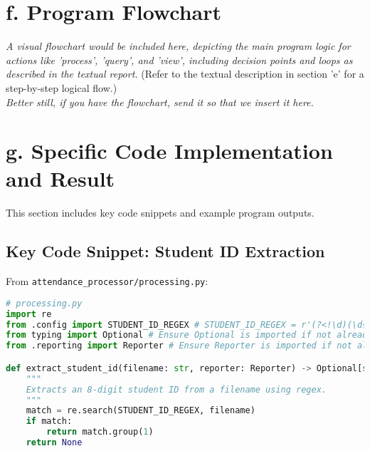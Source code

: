 \documentclass[11pt, a4paper]{article}
\begin{document}
\section*{f. Program Flowchart}
\begin{center}
    \textit{A visual flowchart would be included here, depicting the main program logic for actions like 'process', 'query', and 'view', including decision points and loops as described in the textual report.}
    \vspace{1cm}
    (Refer to the textual description in section 'e' for a step-by-step logical flow.)\\ \textit {Better still, if you have the flowchart, send it so that we insert it here.}
\end{center}

\newpage
\section*{g. Specific Code Implementation and Result}
This section includes key code snippets and example program outputs.

\subsection*{Key Code Snippet: Student ID Extraction}
From \texttt{attendance\_processor/processing.py}:
\begin{lstlisting}[language=Python, caption=Student ID Extraction Logic, basicstyle=\ttfamily\scriptsize]
# processing.py
import re
from .config import STUDENT_ID_REGEX # STUDENT_ID_REGEX = r'(?<!\d)(\d{8})(?!\d)'
from typing import Optional # Ensure Optional is imported if not already
from .reporting import Reporter # Ensure Reporter is imported if not already

def extract_student_id(filename: str, reporter: Reporter) -> Optional[str]:
    """
    Extracts an 8-digit student ID from a filename using regex.
    """
    match = re.search(STUDENT_ID_REGEX, filename)
    if match:
        return match.group(1)
    return None
\end{lstlisting}
\end{document}
